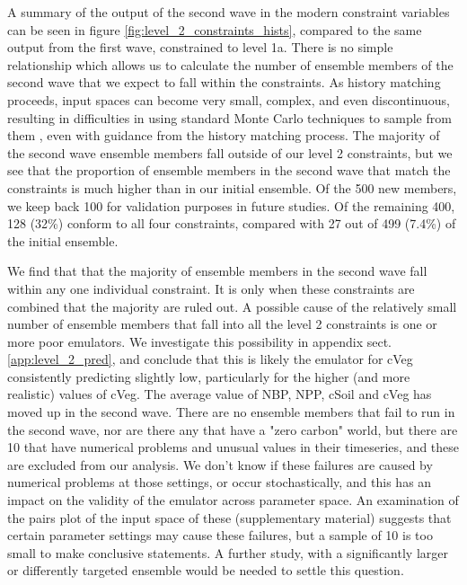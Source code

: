 \documentclass[gmd, manuscript]{copernicus}
\begin{document}
A summary of the output of the second wave in the modern constraint variables can be seen in figure \ref{fig:level_2_constraints_hists}, compared to the same output from the first wave, constrained to level 1a. There is no simple relationship which allows us to calculate the number of ensemble members of the second wave that we expect to fall within the constraints. As history matching proceeds, input spaces can become very small, complex, and even discontinuous, resulting in difficulties in using standard Monte Carlo techniques to sample from them \citep{williamson2013efficient}, even with guidance from the history matching process. The majority of the second wave ensemble members fall outside of our level 2 constraints, but we see that the proportion of ensemble members in the second wave that match the constraints is much higher than in our initial ensemble. Of the 500 new members, we keep back 100 for validation purposes in future studies. Of the remaining 400, 128 (32\%) conform to all four constraints, compared with 27 out of 499 (7.4\%) of the initial ensemble.

We find that that the majority of ensemble members in the second wave fall within any one individual constraint. It is only when these constraints are combined that the majority are ruled out. A possible cause of the relatively small number of ensemble members that fall into all the level 2 constraints is one or more poor emulators. We investigate this possibility in appendix sect. \ref{app:level_2_pred}, and conclude that this is likely the emulator for cVeg consistently predicting slightly low, particularly for the higher (and more realistic) values of cVeg. The average value of NBP, NPP, cSoil and cVeg has moved up in the second wave. There are no ensemble members that fail to run in the second wave, nor are there any that have a "zero carbon" world, but there are 10 that have numerical problems and unusual values in their timeseries, and these are excluded from our analysis. We don't know if these failures are caused by numerical problems at those settings, or occur stochastically, and this has an impact on the validity of the emulator across parameter space. An examination of the pairs plot of the input space of these (supplementary material) suggests that certain parameter settings may cause these failures, but a sample of 10 is too small to make conclusive statements. A further study, with a significantly larger or differently targeted ensemble would be needed to settle this question.
\end{document}
